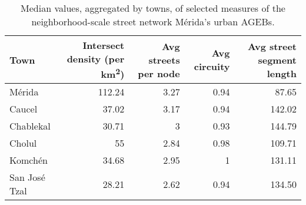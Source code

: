 \begin{table*}[htbp]
	\centering
	\caption{Median values, aggregated by towns, of selected measures of the neighborhood-scale street network Mérida's urban AGEBs.}
	\label{tab:medians_town_aggregate}
	\footnotesize
	\begin{tabular}{ l r r r r }
		\toprule
		Town & Intersect density (per km\textsuperscript{2}) & Avg streets per node & Avg circuity & Avg street segment length \\
		\midrule
		Mérida    &  112.24                       & 3.27                 & 0.94         & 87.65                    \\
		Caucel    &  37.02                       & 3.17                 & 0.94         & 142.02                    \\
		Chablekal    & 30.71                       & 3                 & 0.93         & 144.79                    \\
		Cholul    & 55                       & 2.84                 & 0.98         & 109.71                    \\
		Komchén    & 34.68                       & 2.95                 & 1         & 131.11                    \\
		San José Tzal    & 28.21                       & 2.62                 & 0.94         & 134.50                    \\
		
		\bottomrule
	\end{tabular}
\end{table*}

